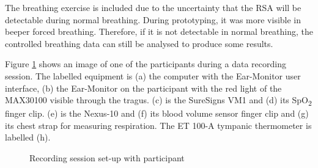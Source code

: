 The breathing exercise is included due to the uncertainty that the RSA will be detectable during normal breathing. During prototyping, it was more visible in beeper forced breathing. Therefore, if it is not detectable in normal breathing, the controlled breathing data can still be analysed to produce some results. 

\medskip

Figure \ref{fig:TrialPhoto} shows an image of one of the participants during a data recording session. The labelled equipment is (a) the computer with the Ear-Monitor user interface, (b) the Ear-Monitor on the participant with the red light of the MAX30100 visible through the tragus. (c) is the SureSigns VM1 and (d) its SpO\textsubscript{2} finger clip. (e) is the Nexus-10 and (f) its blood volume sensor finger clip and (g) its chest strap for measuring respiration. The ET 100-A tympanic thermometer is labelled (h).

\begin{figure}[H]
\centering
\graphicspath{{figs/}}

\caption{Recording session set-up with participant}
\label{fig:TrialPhoto}
\end{figure}

